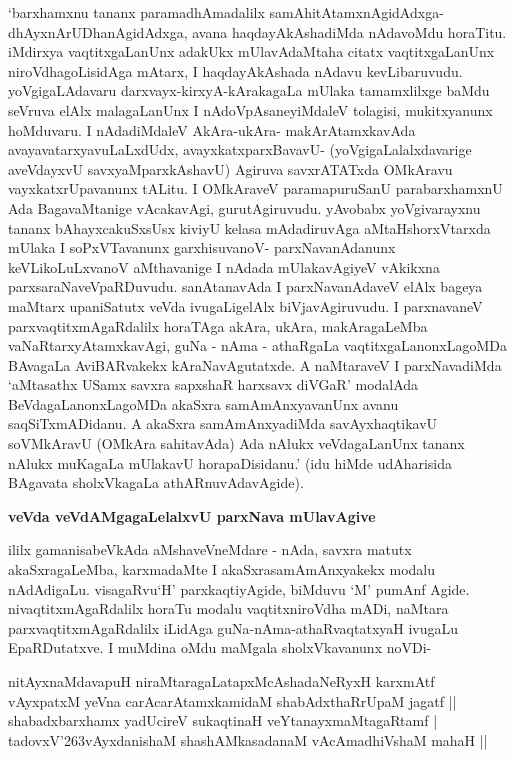 `barxhamxnu tananx paramadhAmadalilx samAhitAtamxnAgidAdxga- dhAyxnArUDhanAgidAdxga, avana haqdayAkAshadiMda nAdavoMdu horaTitu. iMdirxya vaqtitxgaLanUnx adakUkx mUlavAdaMtaha citatx vaqtitxgaLanUnx niroVdhagoLisidAga mAtarx, I haqdayAkAshada nAdavu kevLibaruvudu. yoVgigaLAdavaru darxvayx-kirxyA-kArakagaLa mUlaka tamamxlilxge baMdu seVruva elAlx malagaLanUnx I nAdoVpAsaneyiMdaleV tolagisi, mukitxyanunx hoMduvaru. I nAdadiMdaleV AkAra-ukAra- makArAtamxkavAda avayavatarxyavuLaLxdUdx, avayxkatxparxBavavU- (yoVgigaLalalxdavarige aveVdayxvU savxyaMparxkAshavU) Agiruva savxrATATxda OMkAravu vayxkatxrUpavanunx tALitu. I OMkAraveV paramapuruSanU parabarxhamxnU Ada BagavaMtanige vAcakavAgi, gurutAgiruvudu. yAvobabx yoVgivarayxnu tananx bAhayxcakuSxsUsx kiviyU kelasa mAdadiruvAga aMtaHshorxVtarxda mUlaka I soPxVTavanunx garxhisuvanoV- parxNavanAdanunx keVLikoLuLxvanoV aMthavanige I nAdada mUlakavAgiyeV vAkikxna parxsaraNaveVpaRDuvudu. sanAtanavAda I parxNavanAdaveV elAlx bageya maMtarx upaniSatutx veVda ivugaLigelAlx biVjavAgiruvudu. I parxnavaneV parxvaqtitxmAgaRdalilx horaTAga akAra, ukAra, makAragaLeMba vaNaRtarxyAtamxkavAgi, guNa - nAma - athaRgaLa vaqtitxgaLanonxLagoMDa BAvagaLa AviBARvakekx kAraNavAgutatxde. A naMtaraveV I parxNavadiMda `aMtasathx USamx savxra sapxshaR harxsavx diVGaR' modalAda BeVdagaLanonxLagoMDa akaSxra samAmAnxyavanUnx avanu saqSiTxmADidanu. A akaSxra samAmAnxyadiMda savAyxhaqtikavU soVMkAravU (OMkAra sahitavAda) Ada nAlukx veVdagaLanUnx tananx nAlukx muKagaLa mUlakavU horapaDisidanu.' (idu hiMde udAharisida BAgavata sholxVkagaLa athARnuvAdavAgide).

{\bf veVda veVdAMgagaLelalxvU parxNava mUlavAgive}

ililx gamanisabeVkAda aMshaveVneMdare - nAda, savxra matutx akaSxragaLeMba, karxmadaMte I akaSxrasamAmAnxyakekx modalu nAdAdigaLu. visagaRvu`H' parxkaqtiyAgide, biMduvu `M' pumAnf Agide. nivaqtitxmAgaRdalilx horaTu modalu vaqtitxniroVdha mADi, naMtara parxvaqtitxmAgaRdalilx iLidAga guNa-nAma-athaRvaqtatxyaH ivugaLu EpaRDutatxve. I muMdina oMdu maMgala sholxVkavanunx noVDi-

\begin{shloka}
nitAyxnaMdavapuH niraMtaragaLatapxMcAshadaNeRyxH karxmAtf\\
vAyxpatxM yeVna carAcarAtamxkamidaM shabAdxthaRrUpaM jagatf ||\\
shabadxbarxhamx yadUcireV sukaqtinaH veYtanayxmaMtagaRtamf |\\
tadovxV\char'263vAyxdanishaM shashAMkasadanaM vAcAmadhiVshaM mahaH ||
\end{shloka}

